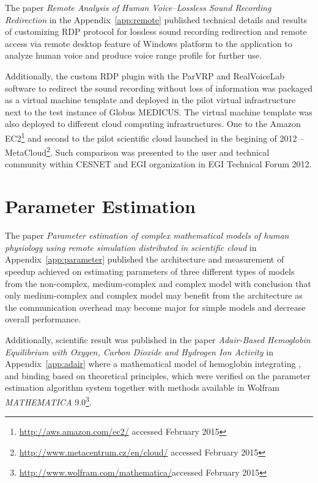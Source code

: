 The paper \cite{kulhanek2010b} \emph{Remote Analysis of Human Voice--Lossless Sound Recording Redirection} in the Appendix~\ref{app:remote} published technical details and results of customizing RDP protocol for lossless sound recording redirection and remote access via remote desktop feature of Windows platform to the application to analyze human voice and produce voice range profile for further use. 

Additionally, the custom RDP plugin with the ParVRP and RealVoiceLab software to redirect the sound recording without loss of information was packaged as a virtual machine template and  deployed in the pilot virtual infrastructure next to the test instance of Globus MEDICUS. The virtual machine template was also deployed to different cloud computing infrastructures. One to the Amazon EC2\footnote{\url{http://aws.amazon.com/ec2/} accessed February 2015} and second to the pilot scientific cloud launched in the begining of 2012 --MetaCloud\footnote{\url{http://www.metacentrum.cz/en/cloud/} accessed February 2015}. Such comparison was presented to the user and technical community within CESNET and EGI organization in EGI Technical Forum 2012\cite{Kulhanek2012a}.

\section{Parameter Estimation}
\label{sec:resultsestimation}

The paper \cite{Kulhanek2014Parameters} \emph{Parameter estimation of complex mathematical models of human physiology using remote simulation distributed in scientific cloud} in Appendix~\ref{app:parameter} published the architecture and measurement of speedup achieved on estimating parameters of three  different types of models from the non-complex, medium-complex and complex model with conclusion that only medium-complex and complex model may benefit from the architecture as the communication overhead may become major for simple models and decrease overall performance. 

Additionally, scientific result was published in the paper \cite{Matejak2014sj} \emph{Adair-Based Hemoglobin Equilibrium with Oxygen, Carbon Dioxide and Hydrogen Ion Activity} in Appendix~\ref{app:adair} where a mathematical model of hemoglobin integrating ,  and  binding based on theoretical principles, which were verified on the parameter estimation algorithm system\cite{Kulhanek2014Parameters} together with methods available in Wolfram \emph{MATHEMATICA} 9.0\footnote{\url{http://www.wolfram.com/mathematica/}accessed February 2015}.

